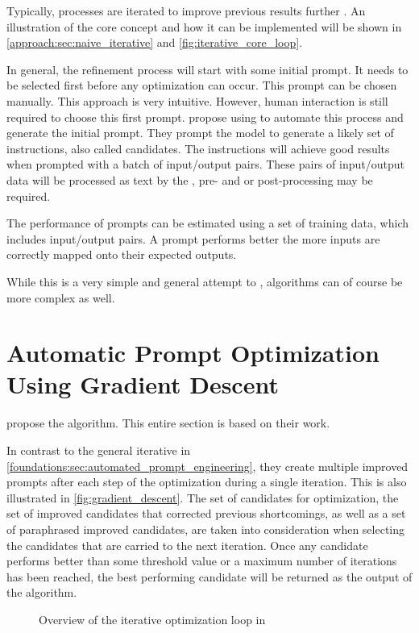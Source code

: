 Typically, \APE processes are iterated to improve previous results further \citeiterative.
An illustration of the core concept and how it can be implemented will be shown in \autoref{approach:sec:naive_iterative} and  \autoref{fig:iterative_core_loop}.

In general, the refinement process will start with some initial prompt.
It needs to be selected first before any optimization can occur.
This prompt can be chosen manually.
This approach is very intuitive.
However, human interaction is still required to choose this first prompt.
 propose using \LLMs to automate this process and generate the initial prompt.
They prompt the model to generate a likely set of instructions, also called candidates.
The instructions will achieve good results when prompted with a batch of input/output pairs.
These pairs of input/output data will be processed as text by the \LLM, pre- and or post-processing may be required.

The performance of prompts can be estimated using a set of training data, which includes input/output pairs.
A prompt performs better the more inputs are correctly mapped onto their expected outputs.

While this is a very simple and general attempt to \APE, algorithms can of course be more complex as well.


\section{Automatic Prompt Optimization Using Gradient Descent}
\label{sec:gradient_descent}
 propose the \ProTeGi algorithm.
This entire section is based on their work.

In contrast to the general iterative \APE in \autoref{foundations:sec:automated_prompt_engineering}, they create multiple improved prompts after each step of the optimization during a single iteration.
This is also illustrated in \autoref{fig:gradient_descent}.
The set of candidates for optimization, the set of improved candidates that corrected previous shortcomings, as well as a set of paraphrased improved candidates, are taken into consideration when selecting the candidates that are carried to the next iteration.
Once any candidate performs better than some threshold value or a maximum number of iterations has been reached, the best performing candidate will be returned as the output of the \ProTeGi algorithm.

\begin{figure}
\centering

\caption{Overview of the iterative optimization loop in~\cite{pryzant2023AutomaticPrompt}}
\label{fig:gradient_descent}
\end{figure}

